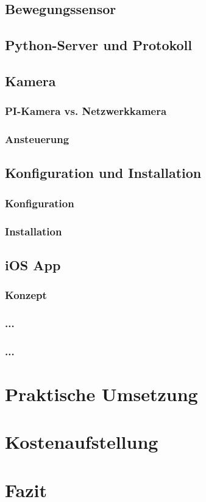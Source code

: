 \section{Bewegungssensor} 

\section{Python-Server und Protokoll} 
\section{Kamera}
\subsection{PI-Kamera vs. Netzwerkkamera}
\subsection{Ansteuerung}

\section{Konfiguration und Installation}
\subsection{Konfiguration}
\subsection{Installation}

\section{iOS App}
\subsection{Konzept}
\subsection{...}
\subsection{...}

\chapter{Praktische Umsetzung}

\chapter{Kostenaufstellung}

\chapter{Fazit}


 

 